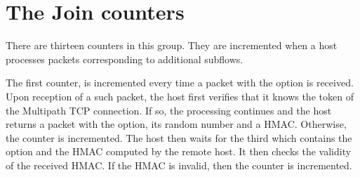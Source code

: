 \documentclass[letterpaper,10pt,english]{sphinxmanual}
\begin{document}
\begin{sphinxVerbatim}[commandchars=\\\{\}]
\end{sphinxVerbatim}


\section{The Join counters}
\label{\detokenize{nstat-mptcp:the-join-counters}}
\sphinxAtStartPar
There are thirteen counters in this group. They are incremented when a host
processes  packets corresponding to additional subflows.

\sphinxAtStartPar
The first counter,  is incremented every time a
 packet with the  option is received. Upon reception
of a such packet, the host first verifies that it knows the token of
the Multipath TCP connection. If so, the processing continues and
the host returns a  packet with the  option, its
random number and a HMAC. Otherwise, the 
counter is incremented. The host then waits for the third 
which contains the  option and the HMAC computed by
the remote host. It then checks the validity of the received HMAC. If
the HMAC is invalid, then the  counter
is incremented.
\end{document}

